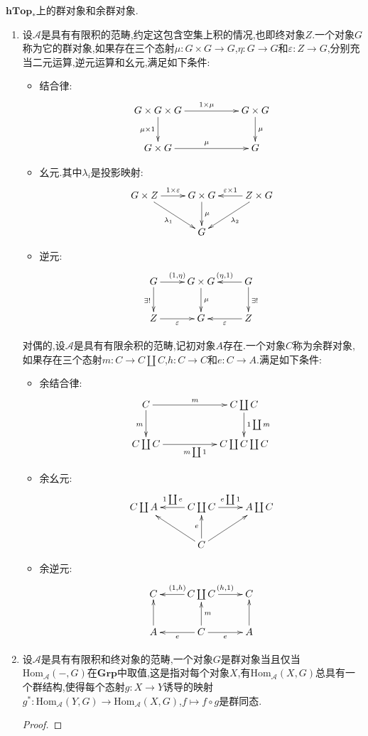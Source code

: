 $\textbf{hTop}_*$上的群对象和余群对象.
\begin{enumerate}
	\item 设$\mathscr{A}$是具有有限积的范畴,约定这包含空集上积的情况,也即终对象$Z$.一个对象$G$称为它的群对象,如果存在三个态射$\mu:G\times G\to G$,$\eta:G\to G$和$\varepsilon:Z\to G$,分别充当二元运算,逆元运算和幺元,满足如下条件:
	\begin{itemize}
		\item 结合律:
		$$\xymatrix{G\times G\times G\ar[rr]^{1\times\mu}\ar[d]_{\mu\times1}&&G\times G\ar[d]^{\mu}\\G\times G\ar[rr]^{\mu}&&G}$$
		\item 幺元.其中$\lambda_i$是投影映射:
		$$\xymatrix{G\times Z\ar[r]^{1\times\varepsilon}\ar[dr]_{\lambda_1}&G\times G\ar[d]^{\mu}&Z\times G\ar[l]_{\varepsilon\times1}\ar[dl]^{\lambda_2}\\&G&}$$
		\item 逆元:
		$$\xymatrix{G\ar[r]^{(1,\eta)}\ar[d]_{\exists!}&G\times G\ar[d]^{\mu}&G\ar[l]_{(\eta,1)}\ar[d]^{\exists!}\\Z\ar[r]_{\varepsilon}&G&Z\ar[l]^{\varepsilon}}$$
	\end{itemize}

    对偶的,设$\mathscr{A}$是具有有限余积的范畴,记初对象$A$存在.一个对象$C$称为余群对象,如果存在三个态射$m:C\to C\coprod C$,$h:C\to C$和$e:C\to A$.满足如下条件:
    \begin{itemize}
    	\item 余结合律:
    	$$\xymatrix{C\ar[rr]^m\ar[d]_m&&C\coprod C\ar[d]^{1\coprod m}\\C\coprod C\ar[rr]_{m\coprod 1}&&C\coprod C\coprod C}$$
    	\item 余幺元:
    	$$\xymatrix{C\coprod A&C\coprod C\ar[l]_{1\coprod e}\ar[r]^{e\coprod1}&A\coprod C\\&C\ar[u]^e\ar[ur]\ar[ul]&}$$
    	\item 余逆元:
    	$$\xymatrix{C&C\coprod C\ar[l]_{(1,h)}\ar[r]^{(h,1)}&C\\A\ar[u]&C\ar[l]^e\ar[r]_e\ar[u]_m&A\ar[u]}$$
    \end{itemize}
    \item 设$\mathscr{A}$是具有有限积和终对象的范畴,一个对象$G$是群对象当且仅当$\mathrm{Hom}_{\mathscr{A}}(-,G)$在$\textbf{Grp}$中取值,这是指对每个对象$X$,有$\mathrm{Hom}_{\mathscr{A}}(X,G)$总具有一个群结构,使得每个态射$g:X\to Y$诱导的映射$g^*:\mathrm{Hom}_{\mathscr{A}}(Y,G)\to\mathrm{Hom}_{\mathscr{A}}(X,G)$,$f\mapsto f\circ g$是群同态.
    \begin{proof}
    	

\end{proof}
\end{enumerate}
